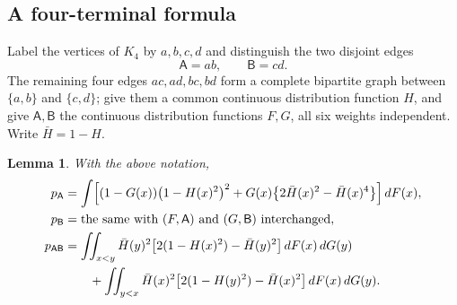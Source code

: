 \documentclass[11pt,a4paper]{amsart}
\theoremstyle{plain}
\newtheorem{lemma}[theorem]{Lemma}
\theoremstyle{definition}
\theoremstyle{remark}
\begin{document}
\subsection{A four-terminal formula}

Label the vertices of $K_4$ by $a,b,c,d$ and distinguish the two disjoint edges
\[
\mathsf A=ab,\qquad \mathsf B=cd .
\]
The remaining four edges $ac,ad,bc,bd$ form a complete bipartite graph between
$\{a,b\}$ and $\{c,d\}$; give them a common continuous distribution function $H$,
and give $\mathsf A,\mathsf B$ the continuous distribution functions $F,G$, all
six weights independent. Write $\bar H=1-H$.

\begin{lemma}
\label{lem:fourterminal}
With the above notation,
\begin{align}
p_{\mathsf A}&=\int\Bigl[(1-G(x))\bigl(1-H(x)^2\bigr)^2
   +G(x)\bigl\{2\bar H(x)^2-\bar H(x)^4\bigr\}\Bigr]\,dF(x),
\label{eq:pA}\\
p_{\mathsf B}&=\text{the same with }(F,\mathsf A)\text{ and }(G,\mathsf B)
   \text{ interchanged},
\label{eq:pB}\\
p_{\mathsf{AB}}&=\iint_{x<y}\bar H(y)^2\bigl[2(1-H(x)^2)-\bar H(y)^2\bigr]
   \,dF(x)\,dG(y)\notag\\
&\qquad{}+\iint_{y<x}\bar H(x)^2\bigl[2(1-H(y)^2)-\bar H(x)^2\bigr]
   \,dF(x)\,dG(y).
\label{eq:pAB}
\end{align}
\end{lemma}
\end{document}
